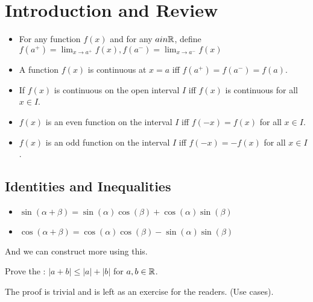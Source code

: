 \documentclass[class=article,crop=false]{standalone}
\begin{document}
\section{Introduction and Review}
\begin{itemize}
	\item For any function $f(x)$ and for any $a in \mathbb{R}$, define $ f(a^{+})= \lim_{ x \to a^{+}} f(x),  f(a^{-}) =\lim_{ x \to a^{-}}f(x)  $
		\item A function $f(x)$ is continuous at  $x=a$ iff  $f(a^{+})=f(a^{-})=f(a)$.
	\item If $f(x)$ is continuous on the open interval  $I$ iff  $f(x)$ is continuous for all  $x \in I$.
	\item  $f(x)$ is an even function on the interval  $I$ iff  $f(-x)=f(x)$ for all  $x \in I$.
	\item $f(x)$ is an odd function on the interval  $I$ iff  $f(-x)=-f(x)$ for all  $x \in I$.
\end{itemize}

\subsection{Identities and Inequalities}
\begin{itemize}
	\item $\sin(\alpha+\beta)=\sin(\alpha)\cos(\beta)+\cos(\alpha)\sin(\beta)$
	\item $\cos(\alpha+\beta) = \cos(\alpha)\cos(\beta)-\sin(\alpha)\sin(\beta)$
\end{itemize}
And we can construct more using this.

\begin{eg}[1]
Prove the : $|a+b|\leq |a|+|b|$ for $a,b \in \mathbb{R}$.
\end{eg}

\begin{prf}
	The proof is trivial and is left as an exercise for the readers. (Use cases).
\end{prf}
\end{document}
